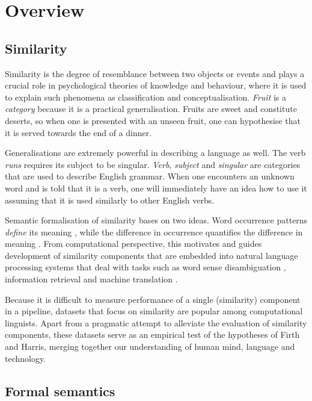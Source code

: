 \chapter{Overview}

\section{Similarity}
\label{sec:similarity}

Similarity is the degree of resemblance between two objects or events \cite{WCS:WCS1282} and plays a crucial role in psychological theories of knowledge and behaviour, where it is used to explain such phenomena as classification and conceptualisation. \textit{Fruit} is a \emph{category} because it is a practical generalisation. Fruits are sweet and constitute deserts, so when one is presented with an unseen fruit, one can hypothesise that it is served towards the end of a dinner.

Generalisations are extremely powerful in describing a language as well. The verb \textit{runs} requires its subject to be singular. \textit{Verb}, \textit{subject} and \textit{singular} are categories that are used to describe English grammar. When one encounters an unknown word and is told that it is a verb, one will immediately have an idea how to use it assuming that it is used similarly to other English verbs.

Semantic formalisation of similarity bases on two ideas. Word occurrence patterns \emph{define} its meaning \cite{firth1957lingtheory}, while the difference in occurrence \textup{quantifies} the difference in meaning \cite{harris1954distributional}. From computational perspective, this motivates and guides development of similarity components that are embedded into natural language processing systems that deal with tasks such as word sense disambiguation \cite{Schutze:1998:AWS:972719.972724}, information retrieval \cite{Salton:1975:VSM:361219.361220} and machine translation \cite{Dagan:1993:CWS:981574.981596}.

Because it is difficult to measure performance of a single (similarity) component in a pipeline, datasets that focus on similarity are popular among computational linguists. Apart from a pragmatic attempt to alleviate the evaluation of similarity components, these datasets serve as an empirical test of the hypotheses of Firth and Harris, merging together our understanding of human mind, language and technology.

\section{Formal semantics}
\label{sec:formal-semantics}

